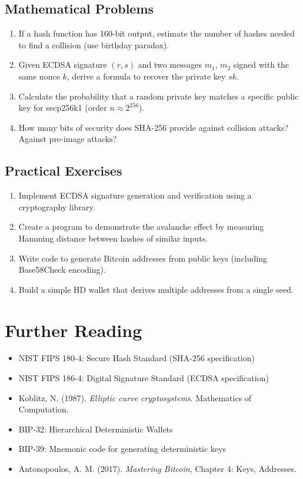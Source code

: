 \documentclass[11pt,a4paper]{article}
\begin{document}
\subsection{Mathematical Problems}

\begin{enumerate}
  \item If a hash function has 160-bit output, estimate the number of hashes needed to find a collision (use birthday paradox).

  \item Given ECDSA signature $(r, s)$ and two messages $m_1$, $m_2$ signed with the same nonce $k$, derive a formula to recover the private key $sk$.

  \item Calculate the probability that a random private key matches a specific public key for secp256k1 (order $n \approx 2^{256}$).

  \item How many bits of security does SHA-256 provide against collision attacks? Against pre-image attacks?
\end{enumerate}

\subsection{Practical Exercises}

\begin{enumerate}
  \item Implement ECDSA signature generation and verification using a cryptography library.

  \item Create a program to demonstrate the avalanche effect by measuring Hamming distance between hashes of similar inputs.

  \item Write code to generate Bitcoin addresses from public keys (including Base58Check encoding).

  \item Build a simple HD wallet that derives multiple addresses from a single seed.
\end{enumerate}

\section{Further Reading}

\begin{itemize}
  \item NIST FIPS 180-4: Secure Hash Standard (SHA-256 specification)
  \item NIST FIPS 186-4: Digital Signature Standard (ECDSA specification)
  \item Koblitz, N. (1987). \textit{Elliptic curve cryptosystems}. Mathematics of Computation.
  \item BIP-32: Hierarchical Deterministic Wallets
  \item BIP-39: Mnemonic code for generating deterministic keys
  \item Antonopoulos, A. M. (2017). \textit{Mastering Bitcoin}, Chapter 4: Keys, Addresses.
\end{itemize}
\end{document}
